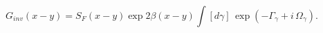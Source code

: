 \begin{equation}
G_{inv}(x-y) = S_F(x-y)\exp{2\beta (x- y) }
\int [d\gamma]\,\exp {(- \Gamma_\gamma + i\,\Omega_\gamma)}.
\label{invs}
\end{equation}

